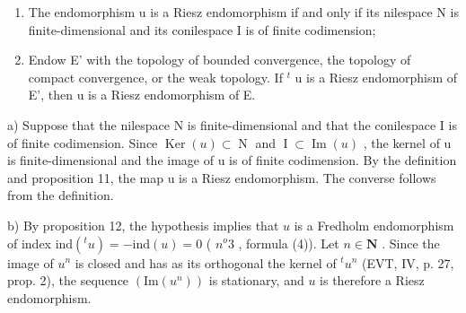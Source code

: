 \begin{enumerate}
\def\labelenumi{\alph{enumi})}
\item
  The endomorphism u is a Riesz endomorphism if and only if its nilespace N is finite-dimensional and its conilespace I is of finite codimension;
\item
 Endow E' with the topology of bounded convergence, the topology of compact convergence, or the weak topology. If \(^{t}\) u is a Riesz endomorphism of E', then u is a Riesz endomorphism of E.
\end{enumerate}
a) Suppose that the nilespace N is finite-dimensional and that the conilespace I is of finite codimension. Since \(\operatorname{Ker}(u) \subset \operatorname{N}\) and \(\operatorname{I} \subset \operatorname{Im}(u)\) , the kernel of u is finite-dimensional and the image of u is of finite codimension. By the definition and proposition 11, the map u is a Riesz endomorphism. The converse follows from the definition.

b) By proposition 12, the hypothesis implies that \(u\) is a Fredholm endomorphism of index \(\text{ind}(^t u) = -\text{ind}(u) = 0\) ( \(n^o 3\) , formula (4)). Let \(n \in \mathbf{N}\) . Since the image of \(u^n\) is closed and has as its orthogonal the kernel of \(^t u^n\) (EVT, IV, p. 27, prop. 2), the sequence \((\text{Im}(u^n))\) is stationary, and \(u\) is therefore a Riesz endomorphism.


